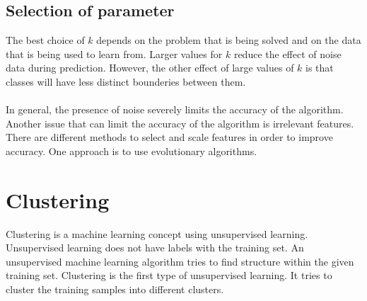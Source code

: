 \subsection{Selection of parameter}
The best choice of $k$ depends on the problem that is being solved and on the data that is being used to learn from. Larger values for $k$ reduce the effect of noise data during prediction. However, the other effect of large values of $k$ is that classes will have less distinct bounderies between them. \\\\
In general, the presence of noise severely limits the accuracy of the algorithm. Another issue that can limit the accuracy of the algorithm is irrelevant features. There are different methods to select and scale features in order to improve accuracy. One approach is to use evolutionary algorithms. \cite{knnEvolutionary}

\section{Clustering}
Clustering is a machine learning concept using unsupervised learning. Unsupervised learning does not have labels with the training set. An unsupervised machine learning algorithm tries to find structure within the given training set. Clustering is the first type of unsupervised learning. It tries to cluster the training samples into different clusters.

